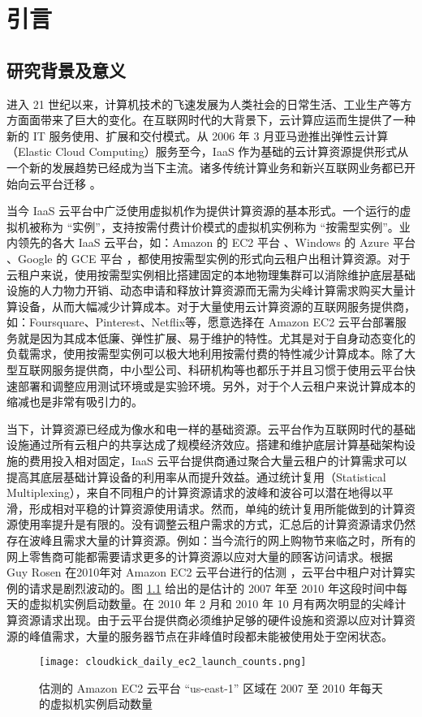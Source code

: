 \chapter{引言}
\label{cha:intro}

\section{研究背景及意义}
进入 21 世纪以来，计算机技术的飞速发展为人类社会的日常生活、工业生产等方方面面带来了巨大的变化。在互联网时代的大背景下，云计算应运而生提供了一种新的 IT 服务使用、扩展和交付模式。从 2006 年 3 月亚马逊推出弹性云计算（Elastic Cloud Computing）服务至今，IaaS 作为基础的云计算资源提供形式从一个新的发展趋势已经成为当下主流。诸多传统计算业务和新兴互联网业务都已开始向云平台迁移 \cite{Armbrust:2010:VCC:1721654.1721672}。

当今 IaaS 云平台中广泛使用虚拟机作为提供计算资源的基本形式。一个运行的虚拟机被称为 ``实例''，支持按需付费计价模式的虚拟机实例称为 ``按需型实例''。业内领先的各大 IaaS 云平台，如：Amazon 的 EC2 平台 \cite{AWS}、Windows 的 Azure 平台 \cite{Azure}、Google 的 GCE 平台 \cite{GCE}，都使用按需型实例的形式向云租户出租计算资源。对于云租户来说，使用按需型实例相比搭建固定的本地物理集群可以消除维护底层基础设施的人力物力开销、动态申请和释放计算资源而无需为尖峰计算需求购买大量计算设备，从而大幅减少计算成本。对于大量使用云计算资源的互联网服务提供商，如：Foursquare、Pinterest、Netflix等，愿意选择在 Amazon EC2 云平台部署服务就是因为其成本低廉、弹性扩展、易于维护的特性。尤其是对于自身动态变化的负载需求，使用按需型实例可以极大地利用按需付费的特性减少计算成本。除了大型互联网服务提供商，中小型公司、科研机构等也都乐于并且习惯于使用云平台快速部署和调整应用测试环境或是实验环境。另外，对于个人云租户来说计算成本的缩减也是非常有吸引力的。

当下，计算资源已经成为像水和电一样的基础资源。云平台作为互联网时代的基础设施通过所有云租户的共享达成了规模经济效应。搭建和维护底层计算基础架构设施的费用投入相对固定，IaaS 云平台提供商通过聚合大量云租户的计算需求可以提高其底层基础计算设备的利用率从而提升效益。通过统计复用（Statistical Multiplexing），来自不同租户的计算资源请求的波峰和波谷可以潜在地得以平滑，形成相对平稳的计算资源使用请求。然而，单纯的统计复用所能做到的计算资源使用率提升是有限的。没有调整云租户需求的方式，汇总后的计算资源请求仍然存在波峰且需求大量的计算资源。例如：当今流行的网上购物节来临之时，所有的网上零售商可能都需要请求更多的计算资源以应对大量的顾客访问请求。根据 Guy Rosen 在2010年对 Amazon EC2 云平台进行的估测 \cite{ec2dailyusage}，云平台中租户对计算实例的请求是剧烈波动的。图 \ref{figure:daily_ec2_launch_counts} 给出的是估计的 2007 年至 2010 年这段时间中每天的虚拟机实例启动数量。在 2010 年 2 月和 2010 年 10 月有两次明显的尖峰计算资源请求出现。由于云平台提供商必须维护足够的硬件设施和资源以应对计算资源的峰值需求，大量的服务器节点在非峰值时段都未能被使用处于空闲状态。
\begin{figure}
  \centering
  \texttt{[image: cloudkick\_daily\_ec2\_launch\_counts.png]}
  \caption{估测的 Amazon EC2 云平台 ``us-east-1'' 区域在 2007 至 2010 年每天的虚拟机实例启动数量 \cite{ec2dailyusage}}
  \label{figure:daily_ec2_launch_counts}
\end{figure}

